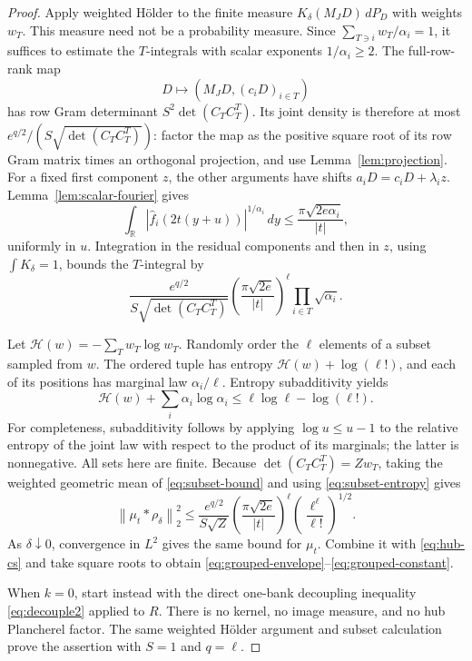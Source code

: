 \documentclass[11pt]{article}
\numberwithin{equation}{section}
\theoremstyle{definition}\newtheorem{definition}[theorem]{Definition}
\theoremstyle{remark}\newtheorem{remark}[theorem]{Remark}
\newcommand{\R}{\mathbb R}\newcommand{\E}{\mathbb E}\newcommand{\PP}{\mathbb P}
\newcommand{\1}{\mathbf 1}\newcommand{\diag}{\operatorname{diag}}
\newcommand{\norm}[1]{\left\lVert#1\right\rVert}\newcommand{\abs}[1]{\left|#1\right|}
\begin{document}
\begin{proof}
Apply weighted H\"older to the finite measure $K_\delta(M_JD)\,dP_D$ with weights $w_T$. This measure need not be a probability measure. Since $\sum_{T\ni i}w_T/\alpha_i=1$, it suffices to estimate the $T$-integrals with scalar exponents $1/\alpha_i\ge2$. The full-row-rank map
\[
 D\longmapsto (M_JD,(c_iD)_{i\in T})
\]
has row Gram determinant $S^2\det(C_TC_T^T)$. Its joint density is therefore at most $e^{q/2}/(S\sqrt{\det(C_TC_T^T)})$: factor the map as the positive square root of its row Gram matrix times an orthogonal projection, and use Lemma~\ref{lem:projection}. For a fixed first component $z$, the other arguments have shifts $a_iD=c_iD+\lambda_i z$. Lemma~\ref{lem:scalar-fourier} gives
\[
 \int_\R |\widehat f_i(2t(y+u))|^{1/\alpha_i}\,dy
 \le\frac{\pi\sqrt{2e\alpha_i}}{|t|},
\]
uniformly in $u$. Integration in the residual components and then in $z$, using $\int K_\delta=1$, bounds the $T$-integral by
\begin{equation}\label{eq:subset-bound}
 \frac{e^{q/2}}{S\sqrt{\det(C_TC_T^T)}}
 \left(\frac{\pi\sqrt{2e}}{|t|}\right)^\ell
 \prod_{i\in T}\sqrt{\alpha_i}.
\end{equation}

Let $\mathcal H(w)=-\sum_Tw_T\log w_T$. Randomly order the $\ell$ elements of a subset sampled from $w$. The ordered tuple has entropy $\mathcal H(w)+\log(\ell!)$, and each of its positions has marginal law $\alpha_i/\ell$. Entropy subadditivity yields
\begin{equation}\label{eq:subset-entropy}
 \mathcal H(w)+\sum_i\alpha_i\log\alpha_i
 \le\ell\log\ell-\log(\ell!).
\end{equation}
For completeness, subadditivity follows by applying $\log u\le u-1$ to the relative entropy of the joint law with respect to the product of its marginals; the latter is nonnegative. All sets here are finite. Because $\det(C_TC_T^T)=Zw_T$, taking the weighted geometric mean of \eqref{eq:subset-bound} and using \eqref{eq:subset-entropy} gives
\[
 \norm{\mu_t*\rho_\delta}_2^2
 \le\frac{e^{q/2}}{S\sqrt Z}
 \left(\frac{\pi\sqrt{2e}}{|t|}\right)^\ell
 \left(\frac{\ell^\ell}{\ell!}\right)^{1/2}.
\]
As $\delta\downarrow0$, convergence in $L^2$ gives the same bound for $\mu_t$. Combine it with \eqref{eq:hub-cs} and take square roots to obtain \eqref{eq:grouped-envelope}--\eqref{eq:grouped-constant}.

When $k=0$, start instead with the direct one-bank decoupling inequality \eqref{eq:decouple2} applied to $R$. There is no kernel, no image measure, and no hub Plancherel factor. The same weighted H\"older argument and subset calculation prove the assertion with $S=1$ and $q=\ell$.
\end{proof}
\end{document}
